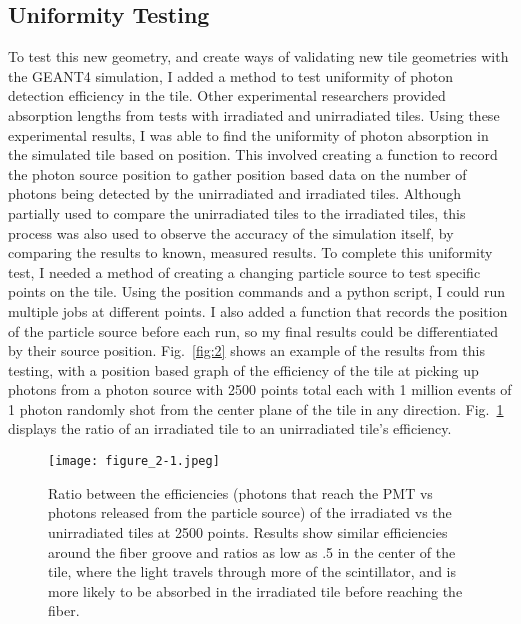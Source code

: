 \documentclass[11pt,twoside,a4paper,dn,final]{cms-tdr}
\begin{document}
\subsection{Uniformity Testing}
	To test this new geometry, and create ways of validating new tile geometries with the GEANT4 simulation, I added a method to test uniformity of photon detection efficiency in the tile. Other experimental researchers provided absorption lengths from tests with irradiated and unirradiated tiles. Using these experimental results, I was able to find the uniformity of photon absorption in the simulated tile based on position. This involved creating a function to record the photon source position to gather position based data on the number of photons being detected by the unirradiated and irradiated tiles. Although partially used to compare the unirradiated tiles to the irradiated tiles, this process was also used to observe the accuracy of the simulation itself, by comparing the results to known, measured results. To complete this uniformity test, I needed a method of creating a changing particle source to test specific points on the tile. Using the position commands and a python script, I could run multiple jobs at different points. I also added a function that records the position of the particle source before each run, so my final results could be differentiated by their source position. Fig.~\ref{fig:2} shows an example of the results from this testing, with a position based graph of the efficiency of the tile at picking up photons from a photon source with 2500 points total each with 1 million events of 1 photon randomly shot from the center plane of the tile in any direction. Fig.~\ref{fig:3} displays the ratio of an irradiated tile to an unirradiated tile’s efficiency.

\begin{figure}[h!]
  \begin{center}
    \texttt{[image: figure\_2-1.jpeg]}
    \caption{Ratio between the efficiencies (photons that reach the PMT vs photons released from the particle source) of the irradiated vs the unirradiated tiles at 2500 points. Results show similar efficiencies around the fiber groove and ratios as low as .5 in the center of the tile, where the light travels through more of the scintillator, and is more likely to be absorbed in the irradiated tile before reaching the fiber.}
    \label{fig:3}
  \end{center}
\end{figure}
\end{document}
